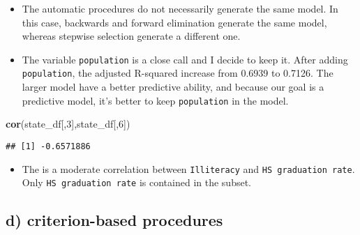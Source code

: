 \documentclass[]{article}
\newenvironment{Shaded}{\begin{snugshade}}{\end{snugshade}}
\newcommand{\ControlFlowTok}[1]{\textcolor[rgb]{0.13,0.29,0.53}{\textbf{#1}}}
\newcommand{\DataTypeTok}[1]{\textcolor[rgb]{0.13,0.29,0.53}{#1}}
\newcommand{\DecValTok}[1]{\textcolor[rgb]{0.00,0.00,0.81}{#1}}
\newcommand{\KeywordTok}[1]{\textcolor[rgb]{0.13,0.29,0.53}{\textbf{#1}}}
\newcommand{\NormalTok}[1]{#1}
\newcommand{\OperatorTok}[1]{\textcolor[rgb]{0.81,0.36,0.00}{\textbf{#1}}}
\newcommand{\StringTok}[1]{\textcolor[rgb]{0.31,0.60,0.02}{#1}}
\providecommand{\tightlist}{%
  \setlength{\itemsep}{0pt}\setlength{\parskip}{0pt}}
\begin{document}
\begin{itemize}
\item
  The automatic procedures do not necessarily generate the same model.
  In this case, backwards and forward elimination generate the same
  model, whereas stepwise selection generate a different one.
\item
  The variable \texttt{population} is a close call and I decide to keep
  it. After adding \texttt{population}, the adjusted R-squared increase
  from 0.6939 to 0.7126. The larger model have a better predictive
  ability, and because our goal is a predictive model, it's better to
  keep \texttt{population} in the model.
\end{itemize}

\begin{Shaded}
\begin{Highlighting}[]
\KeywordTok{cor}\NormalTok{(state_df[,}\DecValTok{3}\NormalTok{],state_df[,}\DecValTok{6}\NormalTok{])}
\end{Highlighting}
\end{Shaded}

\begin{verbatim}
## [1] -0.6571886
\end{verbatim}

\begin{itemize}
\tightlist
\item
  The is a moderate correlation between \texttt{Illiteracy} and
  \texttt{HS\ graduation\ rate}. Only \texttt{HS\ graduation\ rate} is
  contained in the subset.
\end{itemize}

\hypertarget{d-criterion-based-procedures}{%
\subsection{d) criterion-based
procedures}\label{d-criterion-based-procedures}}

\begin{Shaded}
\end{Shaded}
\end{document}
